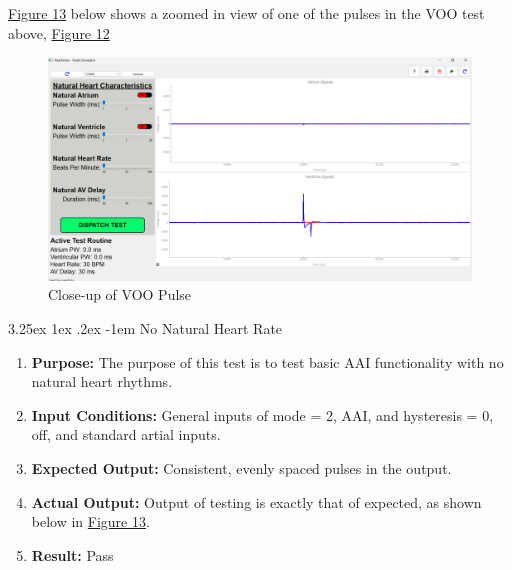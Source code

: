 \documentclass{article}
\makeatletter
\newcounter{subsubsubsection}[subsubsection]
\renewcommand\paragraph{\@startsection{paragraph}{5}{\z@}%
  {3.25ex \@plus1ex \@minus.2ex}%
  {-1em}%
  {\normalfont\normalsize\bfseries}}
\makeatother
\begin{document}
\newpage
\hyperref[VOOpulseclose]{Figure 13} below shows a zoomed in view of one of the pulses in the VOO test above, \hyperref[VOOtest]{Figure 12}

\begin{tcolorbox}
    \begin{figure}[H]
        \label{VOOpulseclose}
        \includegraphics[width=\textwidth]{VOOpulseclose.png}
        \caption{Close-up of VOO Pulse}
    \end{figure}
\end{tcolorbox}

\newpage
{}

\paragraph{No Natural Heart Rate}

\begin{enumerate}[label=]
   \item \textbf{Purpose:} The purpose of this test is to test basic AAI functionality with no natural heart rhythms.
   \item \textbf{Input Conditions:} General inputs of mode = 2, AAI, and hysteresis = 0, off, and standard 
   artial inputs. 
   \item \textbf{Expected Output:} Consistent, evenly spaced pulses in the output.
   \item \textbf{Actual Output:} Output of testing is exactly that of expected, as shown below in \hyperref[AAItestnohr]{Figure 13}.
   \item \textbf{Result:} Pass
\end{enumerate}
\end{document}
